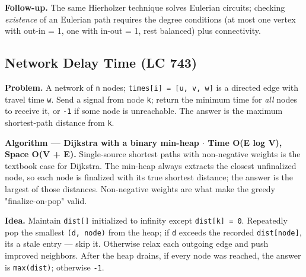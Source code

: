 \documentclass[11pt]{article}
\begin{document}
\textbf{Follow-up.} The same Hierholzer technique solves Eulerian circuits; checking \emph{existence} of an Eulerian path requires the degree conditions (at most one vertex with out-in = 1, one with in-out = 1, rest balanced) plus connectivity.

\subsection{Network Delay Time (LC 743)}\label{network-delay-time-lc-743}

\textbf{Problem.} A network of \texttt{n} nodes; \texttt{times{[}i{]}\ =\ {[}u,\ v,\ w{]}} is a directed edge with travel time \texttt{w}. Send a signal from node \texttt{k}; return the minimum time for \emph{all} nodes to receive it, or \texttt{-1} if some node is unreachable. The answer is the maximum shortest-path distance from \texttt{k}.

\textbf{Algorithm --- Dijkstra with a binary min-heap \(\cdot\) Time O(E log V), Space O(V + E).} Single-source shortest paths with non-negative weights is the textbook case for Dijkstra. The min-heap always extracts the closest unfinalized node, so each node is finalized with its true shortest distance; the answer is the largest of those distances. Non-negative weights are what make the greedy "finalize-on-pop" valid.

\textbf{Idea.} Maintain \texttt{dist{[}{]}} initialized to infinity except \texttt{dist{[}k{]}\ =\ 0}. Repeatedly pop the smallest \texttt{(d,\ node)} from the heap; if \texttt{d} exceeds the recorded \texttt{dist{[}node{]}}, it\textquotesingle s a stale entry --- skip it. Otherwise relax each outgoing edge and push improved neighbors. After the heap drains, if every node was reached, the answer is \texttt{max(dist)}; otherwise \texttt{-1}.

\end{document}
